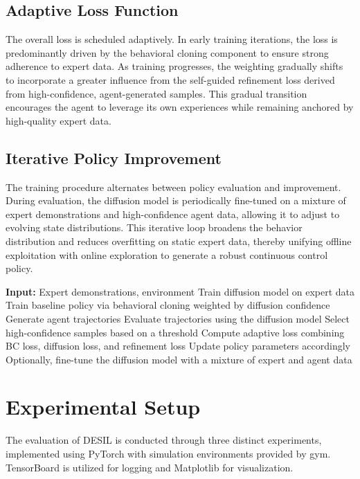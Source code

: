 \documentclass{article} %
\begin{document}
\subsection{Adaptive Loss Function}
The overall loss is scheduled adaptively. In early training iterations, the loss is predominantly driven by the behavioral cloning component to ensure strong adherence to expert data. As training progresses, the weighting gradually shifts to incorporate a greater influence from the self-guided refinement loss derived from high-confidence, agent-generated samples. This gradual transition encourages the agent to leverage its own experiences while remaining anchored by high-quality expert data.

\subsection{Iterative Policy Improvement}
The training procedure alternates between policy evaluation and improvement. During evaluation, the diffusion model is periodically fine-tuned on a mixture of expert demonstrations and high-confidence agent data, allowing it to adjust to evolving state distributions. This iterative loop broadens the behavior distribution and reduces overfitting on static expert data, thereby unifying offline exploitation with online exploration to generate a robust continuous control policy.

\begin{algorithm}[H]
\caption{Dual-Phase Training for DESIL}
\begin{algorithmic}[1]
\State \textbf{Input:} Expert demonstrations, environment
\State Train diffusion model on expert data
\State Train baseline policy via behavioral cloning weighted by diffusion confidence
    \State Generate agent trajectories
    \State Evaluate trajectories using the diffusion model
    \State Select high-confidence samples based on a threshold
    \State Compute adaptive loss combining BC loss, diffusion loss, and refinement loss
    \State Update policy parameters accordingly
    \State Optionally, fine-tune the diffusion model with a mixture of expert and agent data
\EndFor
\end{algorithmic}
\end{algorithm}

\section{Experimental Setup}
\label{sec:experimental}
The evaluation of DESIL is conducted through three distinct experiments, implemented using PyTorch\citep{Becker2011} with simulation environments provided by gym. TensorBoard\citep{Forrester2009} is utilized for logging and Matplotlib\citep{Ball2017} for visualization.
\end{document}
